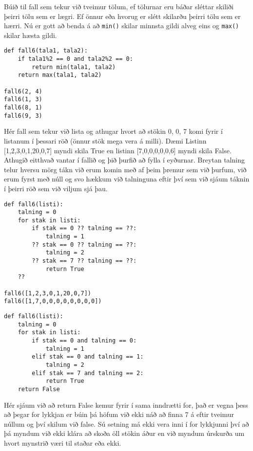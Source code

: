 \begin{exercise}\label{fun6}
Búið til fall sem tekur við tveimur tölum, ef tölurnar eru báðar sléttar skiliði þeirri tölu sem er lægri.
Ef önnur eða hvorug er slétt skilarðu þeirri tölu sem er hærri.
Nú er gott að benda á að \texttt{min()} skilar minnsta gildi alveg eins og \texttt{max()} skilar hæsta gildi.
\end{exercise}
\begin{Answer}[ref={fun6}]
	
	\begin{lstlisting}
def fall6(tala1, tala2):
	if tala1%2 == 0 and tala2%2 == 0:
		return min(tala1, tala2)
	return max(tala1, tala2)

fall6(2, 4)
fall6(1, 3)
fall6(8, 1)
fall6(9, 3)\end{lstlisting}

\end{Answer}


\begin{exercise}\label{fun7}
Hér fall sem tekur við lista og athugar hvort að stökin 0, 0, 7 komi fyrir í listanum í þessari röð (önnur stök mega vera á milli).
Dæmi Listinn [1,2,3,0,1,20,0,7] myndi skila True en listinn [7,0,0,0,0,0,6] myndi skila False.
Athugið  eitthvað vantar í fallið og þið þurfið að fylla í eyðurnar.
Breytan talning telur hversu mörg tákn við erum komin með af þeim þremur sem við þurfum, við erum fyrst með núll og svo hækkum við talninguna eftir því sem við sjáum táknin í þeirri röð sem við viljum sjá þau.
\begin{lstlisting}
def fall6(listi):
	talning = 0
	for stak in listi:
		if stak == 0 ?? talning == ??:
			talning = 1
		?? stak == 0 ?? talning == ??:
			talning = 2
		?? stak == 7 ?? talning == ??:
			return True
	??

fall6([1,2,3,0,1,20,0,7])
fall6([1,7,0,0,0,0,0,0,0,0])
\end{lstlisting}
\end{exercise}
\begin{Answer}[ref={fun7}]

	\begin{lstlisting}
def fall6(listi):
	talning = 0
	for stak in listi:
		if stak == 0 and talning == 0:
			talning = 1
		elif stak == 0 and talning == 1:
			talning = 2
		elif stak == 7 and talning == 2:
			return True
	return False\end{lstlisting}
	Hér sjáum við að return False kemur fyrir í sama inndrætti for, það er vegna þess að þegar for lykkjan er búin þá höfum við ekki náð að finna 7 á eftir tveimur núllum og því skilum við false.
	Sú setning má ekki vera inni í for lykkjunni því að þá myndum við ekki klára að skoða öll stökin áður en við myndum úrskurða um hvort mynstrið væri til staðar eða ekki.
	
\end{Answer}

